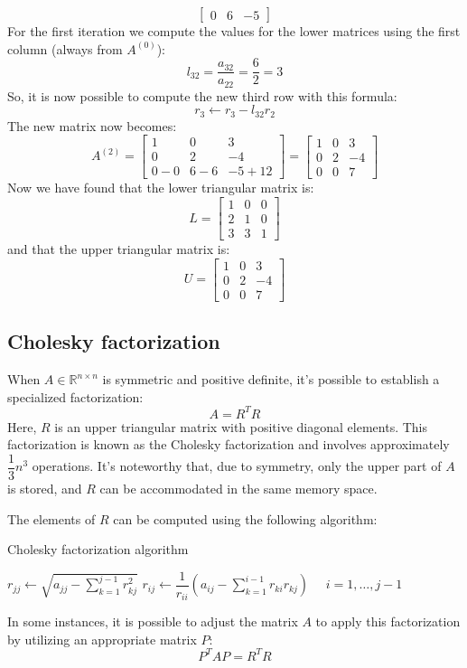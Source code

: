 \documentclass[12pt, a4paper]{report}
\begin{document}
\begin{example}
\[\begin{bmatrix}
            0 & 6 & -5
        \end{bmatrix}\]
        For the first iteration we compute the values for the lower matrices using the first column (always from $A^{(0)}$): 
        \[l_{32}=\dfrac{a_{32}}{a_{22}}=\dfrac{6}{2}=3\]
        So, it is now possible to compute the new third row with this formula: 
        \[r_3 \leftarrow r_3 - l_{32}r_2\]
        The new matrix now becomes: 
        \[A^{(2)}=            
        \begin{bmatrix}
            1 & 0 & 3 \\
            0 & 2 & -4 \\
            0-0 & 6-6 & -5+12
        \end{bmatrix}=
        \begin{bmatrix}
            1 & 0 & 3 \\
            0 & 2 & -4 \\
            0 & 0 & 7
        \end{bmatrix}\]
        Now we have found that the lower triangular matrix is: 
        \[L=
        \begin{bmatrix}
            1 & 0 & 0 \\
            2 & 1 & 0 \\
            3 & 3 & 1
        \end{bmatrix}\]
        and that the upper triangular matrix is: 
        \[U=
        \begin{bmatrix}
            1 & 0 & 3 \\
            0 & 2 & -4 \\
            0 & 0 & 7
        \end{bmatrix}\]
    \end{example}

    \subsection{Cholesky factorization}
    When $A \in \mathbb{R}^{n \times n}$ is symmetric and positive definite, it's possible to establish a specialized factorization:
    \[A=R^TR\]
    Here, $R$ is an upper triangular matrix with positive diagonal elements. 
    This factorization is known as the Cholesky factorization and involves approximately $\dfrac{1}{3}n^3$ operations. 
    It's noteworthy that, due to symmetry, only the upper part of $A$ is stored, and $R$ can be accommodated in the same memory space.

    The elements of $R$ can be computed using the following algorithm:
    \begin{algorithm}[H]
        \caption{Cholesky factorization algorithm}
            \begin{algorithmic}
                \State $r_{jj}\leftarrow\sqrt{a_{jj}-\sum_{k=1}^{j-1}r_{kj}^2}$
                \State $r_{ij}\leftarrow\dfrac{1}{r_{ii}}\left(a_{ij}-\sum_{k=1}^{i-1}r_{ki}r_{kj}\right) \:\:\:\:\:\: i = 1,\dots,j-1$
            \end{algorithmic}
    \end{algorithm}
    In some instances, it is possible to adjust the matrix $A$ to apply this factorization by utilizing an appropriate matrix $P$:
    \[P^TAP=R^TR\]
\end{document}
